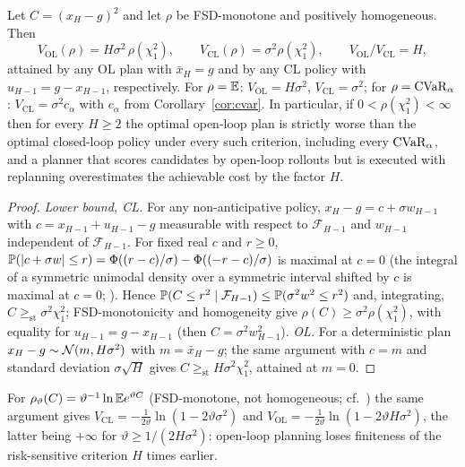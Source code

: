 \begin{theorem}\label{thm:lqg}
Let $C=(x_H-g)^2$ and let $\rho$ be FSD-monotone and positively homogeneous. Then
\[
V_{\mathrm{OL}}(\rho)=H\sigma^2\,\rho(\chi^2_1),\qquad V_{\mathrm{CL}}(\rho)=\sigma^2\rho(\chi^2_1),\qquad V_{\mathrm{OL}}/V_{\mathrm{CL}}=H,
\]
attained by any OL plan with $\bar x_H=g$ and by any CL policy with $u_{H-1}=g-x_{H-1}$, respectively. For $\rho=\mathbb{E}$: $V_{\mathrm{OL}}=H\sigma^2$, $V_{\mathrm{CL}}=\sigma^2$; for $\rho=\operatorname{CVaR}_\alpha$: $V_{\mathrm{CL}}=\sigma^2c_\alpha$ with $c_\alpha$ from Corollary~\ref{cor:cvar}. In particular, if $0<\rho(\chi_1^2)<\infty$ then for every $H\ge2$ the optimal open-loop plan is strictly worse than the optimal closed-loop policy under every such criterion, including every $\operatorname{CVaR}_\alpha$, and a planner that scores candidates by open-loop rollouts but is executed with replanning overestimates the achievable cost by the factor $H$.
\end{theorem}
\begin{proof}
\emph{Lower bound, CL.} For any non-anticipative policy, $x_H-g=c+\sigma w_{H-1}$ with $c=x_{H-1}+u_{H-1}-g$ measurable with respect to $\mathcal F_{H-1}$ and $w_{H-1}$ independent of $\mathcal F_{H-1}$. For fixed real $c$ and $r\ge0$,
$\mathbb{P}(|c+\sigma w|\le r)=\Phi((r-c)/\sigma)-\Phi((-r-c)/\sigma)$ is maximal at $c=0$ (the integral of a symmetric unimodal density over a symmetric interval shifted by $c$ is maximal at $c=0$; \cite{anderson1955}). Hence $\mathbb{P}(C\le r^2\mid\mathcal F_{H-1})\le\mathbb{P}(\sigma^2w^2\le r^2)$ and, integrating, $C\ge_{\mathrm{st}}\sigma^2\chi^2_1$; FSD-monotonicity and homogeneity give $\rho(C)\ge\sigma^2\rho(\chi_1^2)$, with equality for $u_{H-1}=g-x_{H-1}$ (then $C=\sigma^2w_{H-1}^2$).
\emph{OL.} For a deterministic plan $x_H-g\sim\mathcal{N}(m,H\sigma^2)$ with $m=\bar x_H-g$; the same argument with $c=m$ and standard deviation $\sigma\sqrt H$ gives $C\ge_{\mathrm{st}}H\sigma^2\chi^2_1$, attained at $m=0$.
\end{proof}

\begin{remark}
For $\rho_\vartheta(C)=\vartheta^{-1}\ln\mathbb{E} e^{\vartheta C}$ (FSD-monotone, not homogeneous; cf.\ \cite{jacobson1973,whittle1981}) the same argument gives $V_{\mathrm{CL}}=-\frac1{2\vartheta}\ln(1-2\vartheta\sigma^2)$ and $V_{\mathrm{OL}}=-\frac1{2\vartheta}\ln(1-2\vartheta H\sigma^2)$, the latter being $+\infty$ for $\vartheta\ge1/(2H\sigma^2)$: open-loop planning loses finiteness of the risk-sensitive criterion $H$ times earlier.
\end{remark}

